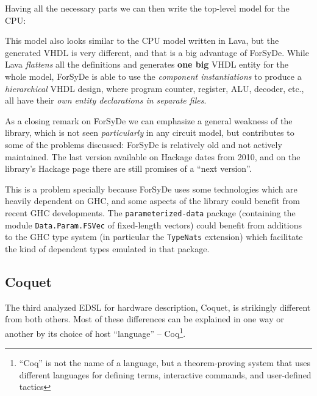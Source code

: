 \documentclass[a4paper]{article}
\begin{document}
                Having all the necessary parts we can then write the top-level model for the CPU:


                This model also looks similar to the CPU model written in Lava, but the generated
                VHDL is very different, and that is a big advantage of ForSyDe. While Lava
                \emph{flattens} all the definitions and generates \textbf{one big} VHDL entity for
                the whole model, ForSyDe is able to use the \emph{component instantiations} to
                produce a \emph{hierarchical} VHDL design, where program counter, register, ALU,
                decoder, etc., all have their \emph{own entity declarations in separate files}.

                As a closing remark on ForSyDe we can emphasize a general weakness of the library,
                which is not seen \emph{particularly} in any circuit model, but contributes to
                some of the problems discussed: ForSyDe is relatively old and not actively
                maintained. The last version available on Hackage\cite{forsyde-3.1.1-hackage} dates
                from 2010, and on the library's Hackage page there are still promises of a ``next
                version''.

                This is a problem specially because ForSyDe uses some technologies which are heavily
                dependent on GHC, and some aspects of the library could benefit from recent GHC
                developments. The \texttt{parameterized-data} package (containing the module
                \texttt{Data.Param.FSVec} of fixed-length vectors) could benefit from additions to
                the GHC type system (in particular the \texttt{TypeNats}\cite{website:ghc-typenats}
                extension) which facilitate the kind of dependent types emulated in that package.


        \subsection{Coquet}
        \label{subsec:coquet}
            The third analyzed EDSL for hardware description, Coquet\cite{coquet2011},
            is strikingly different from both others. Most of these differences can be explained in
            one way or another by its choice of host ``language'' -- Coq\footnote{``Coq'' is not
                the name of a language, but a theorem-proving system that uses different languages
                for defining terms, interactive commands, and user-defined tactics}.
\end{document}

